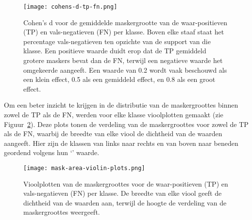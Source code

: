 \begin{figure}[H]
  \centering
  \texttt{[image: cohens-d-tp-fn.png]}
  \caption[
    Cohen's d voor de gemiddelde maskergrootte van de waar-positieven (TP) en vals-negatieven (FN) per klasse
  ]{\label{fig:cohens-d-fn-tp}
    Cohen's d voor de gemiddelde maskergrootte van de waar-positieven (TP) en vals-negatieven (FN) per klasse.
    Boven elke staaf staat het percentage vals-negatieven ten opzichte van de support van die klasse.
    Een positieve waarde duidt erop dat de TP gemiddeld grotere maskers bevat dan de FN, terwijl een negatieve waarde het omgekeerde aangeeft.
    Een waarde van 0.2 wordt vaak beschouwd als een klein effect, 0.5 als een gemiddeld effect, en 0.8 als een groot effect.
  }
\end{figure}

Om een beter inzicht te krijgen in de distributie van de maskergroottes binnen zowel de TP als de FN, werden voor elke klasse vioolplotten gemaakt (zie Figuur~\ref{fig:violinplot-fn-tp}).
Deze plots tonen de verdeling van de maskergroottes voor zowel de TP als de FN, waarbij de breedte van elke viool de dichtheid van de waarden aangeeft.
Hier zijn de klassen van links naar rechts en van boven naar beneden geordend volgens hun `' waarde.

\begin{figure}[H]
  \centering
  \texttt{[image: mask-area-violin-plots.png]}
  \caption[
    Vioolplotten van de maskergroottes voor de waar-positieven (TP) en vals-negatieven (FN) per klasse
  ]{\label{fig:violinplot-fn-tp}
    Vioolplotten van de maskergroottes voor de waar-positieven (TP) en vals-negatieven (FN) per klasse.
    De breedte van elke viool geeft de dichtheid van de waarden aan, terwijl de hoogte de verdeling van de maskergroottes weergeeft.
  }
\end{figure}

